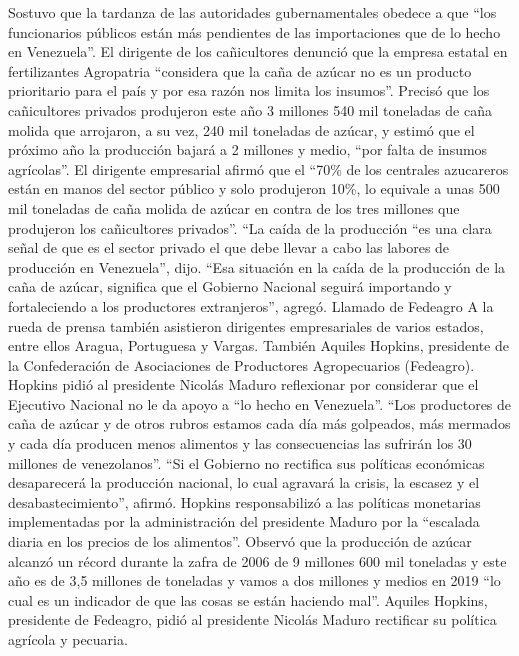 \documentclass{article}%
\begin{document}
\newline%
%
Sostuvo que la tardanza de las autoridades gubernamentales obedece a que “los funcionarios públicos están más pendientes de las importaciones que de lo hecho en Venezuela”.%
\newline%
%
El dirigente de los cañicultores denunció que la empresa estatal en fertilizantes Agropatria “considera que la caña de azúcar no es un producto prioritario para el país y por esa razón nos limita los insumos”.%
\newline%
%
Precisó que los cañicultores privados produjeron este año 3 millones 540 mil toneladas de caña molida que arrojaron, a su vez, 240 mil toneladas de azúcar, y estimó que el próximo  año la producción bajará a 2 millones y medio, “por falta de insumos agrícolas”.%
\newline%
%
El dirigente empresarial afirmó que el “70\% de los centrales azucareros están en manos del sector público y solo produjeron 10\%, lo equivale a unas 500 mil toneladas de caña molida de azúcar en contra de los tres millones que produjeron los cañicultores privados”.%
\newline%
%
“La caída de la producción “es una clara señal de que es el sector privado el que debe llevar a cabo las labores de producción en Venezuela”, dijo.%
\newline%
%
“Esa situación en la caída de la producción de la caña de azúcar, significa que el Gobierno Nacional seguirá importando y fortaleciendo a los productores extranjeros”, agregó.%
\newline%
%
Llamado de Fedeagro%
\newline%
%
A la rueda de prensa también asistieron dirigentes empresariales de varios estados, entre ellos Aragua, Portuguesa y Vargas. También Aquiles Hopkins, presidente de la Confederación de Asociaciones de Productores Agropecuarios (Fedeagro).%
\newline%
%
Hopkins pidió al presidente Nicolás Maduro reflexionar por considerar que el Ejecutivo Nacional no le da apoyo a “lo hecho en Venezuela”.%
\newline%
%
“Los productores de caña de azúcar y de otros rubros estamos cada día más golpeados, más mermados y cada día producen menos alimentos y las consecuencias las sufrirán los 30 millones de venezolanos”.%
\newline%
%
“Si el Gobierno no rectifica sus políticas económicas desaparecerá la producción nacional, lo cual agravará la crisis, la escasez y el desabastecimiento”, afirmó.%
\newline%
%
Hopkins responsabilizó a las políticas monetarias implementadas por la administración del presidente Maduro  por la “escalada diaria en los precios de los  alimentos”.%
\newline%
%
Observó que la producción de azúcar alcanzó un récord durante la zafra de 2006 de 9 millones 600 mil toneladas y este año  es de 3,5 millones de toneladas y vamos a dos millones y medios en 2019 “lo cual es un indicador de que las cosas se están haciendo mal”.%
\newline%
%
Aquiles Hopkins, presidente de Fedeagro, pidió al presidente Nicolás Maduro rectificar su política agrícola y pecuaria.%
\newline%
%
\end{document}
